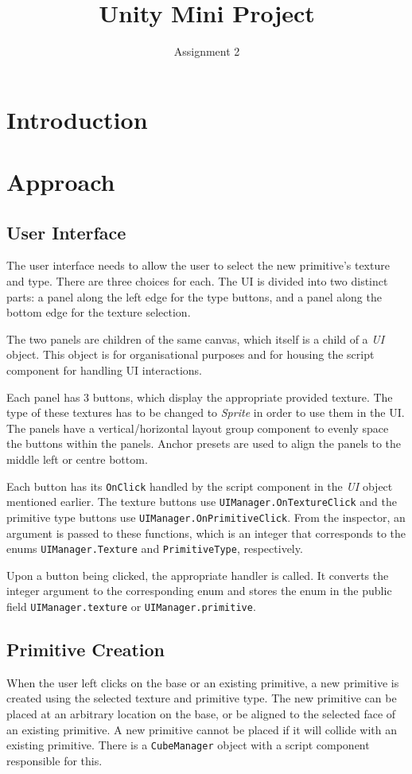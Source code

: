 \documentclass[a4paper, 12pt]{scrartcl}
\title{Unity Mini Project}
\subtitle{Assignment 2}
\date{}
\author{}
\begin{document}
\maketitle

\section{Introduction}

\section{Approach}
\subsection{User Interface}
The user interface needs to allow the user to select the new primitive's texture and type. There are three choices for each. The UI is divided into two distinct parts: a panel along the left edge for the type buttons, and a panel along the bottom edge for the texture selection.

The two panels are children of the same canvas, which itself is a child of a \textit{UI} object. This object is for organisational purposes and for housing the script component for handling UI interactions.

Each panel has 3 buttons, which display the appropriate provided texture. The type of these textures has to be changed to \textit{Sprite} in order to use them in the UI. The panels have a vertical/horizontal layout group component to evenly space the buttons within the panels. Anchor presets are used to align the panels to the middle left or centre bottom.

Each button has its \texttt{OnClick} handled by the script component in the \textit{UI} object mentioned earlier. The texture buttons use \texttt{UIManager.OnTextureClick} and the primitive type buttons use \texttt{UIManager.OnPrimitiveClick}. From the inspector, an argument is passed to these functions, which is an integer that corresponds to the enums \texttt{UIManager.Texture} and \texttt{PrimitiveType}, respectively.

Upon a button being clicked, the appropriate handler is called. It converts the integer argument to the corresponding enum and stores the enum in the public field \texttt{UIManager.texture} or \texttt{UIManager.primitive}.

\subsection{Primitive Creation}
When the user left clicks on the base or an existing primitive, a new primitive is created using the selected texture and primitive type. The new primitive can be placed at an arbitrary location on the base, or be aligned to the selected face of an existing primitive. A new primitive cannot be placed if it will collide with an existing primitive. There is a \texttt{CubeManager} object with a script component responsible for this.
\end{document}
